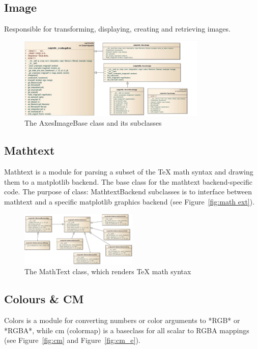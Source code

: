 \documentclass[pdftex,10pt,a4paper]{report}
\begin{document}
\subsection{Image}
Responsible for transforming, displaying, creating and retrieving images.
\begin{figure}[ht!]
        \centering
                \includegraphics[width=0.8\textwidth]{img/umls/josh/img}
        \caption{The AxesImageBase class and its subclasses}\label{fig:math text}
\end{figure}


\subsection{Mathtext}

Mathtext is a module for parsing a subset of the TeX math syntax and drawing them to a matplotlib backend. The base class for the mathtext backend-specific code.  The purpose of class: MathtextBackend subclasses is to interface between mathtext and a specific matplotlib graphics backend (see Figure~\ref{fig:math ext}).

\begin{figure}[ht!]
        \centering
                \includegraphics[width=0.5\textwidth]{img/umls/kevin/mathtext}
        \caption{The MathText class, which renders TeX math syntax}\label{fig:math text}
\end{figure}


\subsection{Colours \& CM}
Colors is a module for converting numbers or color arguments to *RGB* or *RGBA*, while cm (colormap) is a baseclass for all scalar to RGBA mappings (see Figure~\ref{fig:cm} and Figure~\ref{fig:cm_e}).
\end{document}
